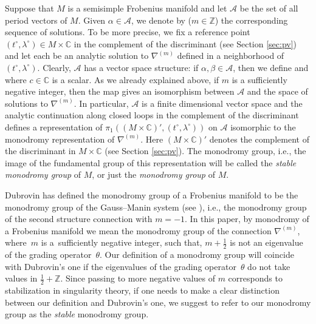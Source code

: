 \documentclass[pdftex]{sigma}
\numberwithin{equation}{section}
\newcommand{\CC}{\mathbb{C}}
\newcommand{\ZZ}{\mathbb{Z}}
\newcommand{\A}{\mathcal{A}}
\begin{document}
Suppose that $M$ is a semisimple Frobenius manifold and let $\A$ be the set of all period vectors of $M$. Given $\alpha\in \A$, we denote by  ($m\in \ZZ$) the corresponding sequence of solutions. To be more precise, we fix a reference point $(t^\circ,\lambda^\circ)\in M\times \CC$ in the complement of the discriminant (see Section \ref{sec:pv}) and let each  be an analytic solution to $\nabla^{(m)}$ defined in a neighborhood of $(t^\circ,\lambda^\circ)$. Clearly, $\A$ has a vector space structure: if $\alpha,\beta\in \A$, then we define  and
 where $c\in \CC$ is a scalar. As we already explained above, if $m$ is a sufficiently negative integer, then the map  gives an isomorphism between $\A$ and the space of solutions to $\nabla^{(m)}$. In particular, $\A$ is a finite dimensional vector space and the analytic continuation along closed loops in the complement of the discriminant defines a representation of $\pi_1((M\times \CC)',(t^\circ,\lambda^\circ))$ on $\A$ isomorphic to the monodromy representation of $\nabla^{(m)}$. Here $(M\times \CC)'$ denotes the complement of the discriminant in $M\times \CC$ (see Section \ref{sec:pv}). The monodromy group, i.e., the image of the fundamental group of this representation will be called the {\em stable monodromy group} of $M$, or just the {\em monodromy group} of $M$.
\begin{Remark}\label{re:monodromy}
Dubrovin has defined the monodromy group of a Frobenius manifold to be the monodromy group of the Gauss--Manin system (see \cite[Definition~5.6]{Dubrovin1999}), i.e., the monodromy group of the second structure connection with $m=-1$.
In this paper, by monodromy of a Frobenius manifold we mean the
monodromy group of the connection $\nabla^{(m)}$, where~$m$ is a~sufficiently
negative integer, such that, $m+\tfrac{1}{2}$ is not an eigenvalue of
the grading operator~$\theta$. Our definition of a monodromy group
will coincide with Dubrovin's one if the eigenvalues of the grading
operator~$\theta$ do not take values in $\tfrac{1}{2}+\ZZ$. Since
passing to more negative values of $m$ corresponds to stabilization in
singularity theory, if one needs to make a clear distinction between our definition and Dubrovin's one, we suggest to refer to our monodromy group as the {\em stable} monodromy group.
\end{Remark}
\end{document}
